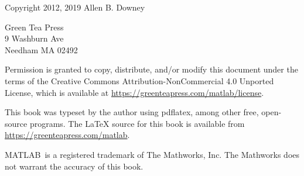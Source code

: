 \vspace{2in}

\begin{center}
{\Large \thetitle}

\vspace{0.25in}

Copyright 2012, 2019 Allen B. Downey
\end{center}

\vspace{0.25in}

\begin{flushleft}
Green Tea Press       \\
9 Washburn Ave \\
Needham MA 02492
\end{flushleft}

Permission is granted to copy, distribute, and/or modify this document
under the terms of the Creative Commons Attribution-NonCommercial 4.0 Unported License, which is available at \url{https://greenteapress.com/matlab/license}.

This book was typeset by the author using pdflatex,
among other free, open-source programs.
The LaTeX source for this book is available from
\url{https://greenteapress.com/matlab}.

MATLAB\myreg\ is a registered trademark of The
Mathworks, Inc.  The Mathworks does not warrant the accuracy
of this book.


\dominitoc
\dominilof
\dominilot

\brieftableofcontents

\tableofcontents
\adjustmtc{}



\mainmatter


































\printindex


